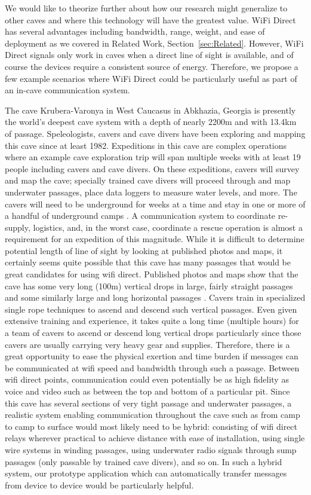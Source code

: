 \documentclass[10pt,twocolumn]{article}
\begin{document}
We would like to theorize further about how our research might generalize to other caves and where this technology will have the greatest value.
WiFi Direct has several advantages including bandwidth, range, weight, and ease of deployment as we covered in Related Work, Section~\ref{sec:Related}.
However, WiFi Direct signals only work in caves when a direct line of sight is available, 
and of course the devices require a consistent source of energy.
Therefore, we propose a few example scenarios where WiFi Direct could be particularly useful as part of an in-cave communication system.

The cave Krubera-Varonya in West Caucasus in Abkhazia, Georgia is presently the world's deepest cave system with a depth of nearly 2200m and with 13.4km of passage. 
Speleologists, cavers and cave divers have been exploring and mapping this cave since at least 1982.
Expeditions in this cave are complex operations where an example cave exploration trip will span multiple weeks with at least 19 people including cavers and cave divers.
On these expeditions, cavers will survey and map the cave; specially trained cave divers will proceed through and map underwater passages, place data loggers to measure water levels, and more.
The cavers will need to be underground for weeks at a time and stay in one or more of a handful of underground camps \cite{krub_it}.
A communication system to coordinate re-supply, logistics, and, in the worst case, coordinate a rescue operation is almost a requirement for an expedition of this magnitude.
While it is difficult to determine potential length of line of sight by looking at published photos and maps, 
it certainly seems quite possible that this cave has many passages that would be great candidates for using wifi direct.
Published photos and maps show that the cave has some very long (100m) vertical drops in large, fairly straight passages and some similarly large and long horizontal passages \cite{krub_it}.
Cavers train in specialized single rope techniques to ascend and descend such vertical passages.
Even given extensive training and experience, it takes quite a long time (multiple hours) for a team of cavers to ascend or descend long vertical drops particularly since those cavers are usually carrying very heavy gear and supplies.
Therefore, there is a great opportunity to ease the physical exertion and time burden if messages can be communicated at wifi speed and bandwidth through such a passage.
Between wifi direct points, communication could even potentially be as high fidelity as voice and video such as between the top and bottom of a particular pit.
Since this cave has several sections of very tight passage and underwater passages,
a realistic system enabling communication throughout the cave such as from camp to camp to surface would most likely need to be hybrid:
consisting of wifi direct relays wherever practical to achieve distance with ease of installation, using single wire systems in winding passages, using underwater radio signals through sump passages (only passable by trained cave divers), and so on.
In such a hybrid system, our prototype application which can automatically transfer messages from device to device would be particularly helpful.
\end{document}
